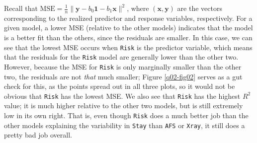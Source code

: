\documentclass[10pt]{article}
\begin{document}
\begin{itemize}
\begin{table}
    \end{table}
    Recall that \(\mathrm{MSE} = \frac{1}{n}\|\mathbf{y} - b_0 \mathbf{1} - b_1 \mathbf{x}\|^2\), where \((\mathbf{x},\mathbf{y})\) are the vectors 
    corresponding 
    to the realized predictor and response variables, respectively. For a given model, a lower MSE (relative to the other models) indicates that the model is 
    a better fit than the others, since the residuals are smaller. In this case, we can see that the lowest MSE occurs when \texttt{Risk} is the predictor
    variable, which means that the residuals for the \texttt{Risk} model are generally lower than the other two. However, because the MSE for \texttt{Risk}
    is only marginally smaller than the other two, the residuals are not \textit{that} much smaller; Figure \ref{q02-fig02} serves as a gut check for this, 
    as the points spread out in all three plots, so it would not be obvious that \texttt{Risk} has the lowest MSE. We also see that \texttt{Risk} has the 
    highest \(R^2\) value; it is much higher relative to the other two models, but is still extremely low in its own right. That is, even though 
    \texttt{Risk} does a much better job than the other models explaining the variability in \texttt{Stay} than \texttt{AFS} or \texttt{Xray}, it still does 
    a pretty bad job overall. 
\end{itemize}

\end{document}
